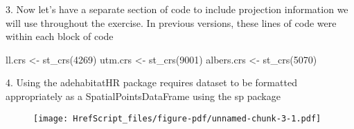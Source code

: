 \documentclass[
  letterpaper,
]{book}
\newenvironment{Shaded}{\begin{snugshade}}{\end{snugshade}}
\newcommand{\AttributeTok}[1]{\textcolor[rgb]{0.40,0.45,0.13}{#1}}
\newcommand{\CommentTok}[1]{\textcolor[rgb]{0.37,0.37,0.37}{#1}}
\newcommand{\DecValTok}[1]{\textcolor[rgb]{0.68,0.00,0.00}{#1}}
\newcommand{\FunctionTok}[1]{\textcolor[rgb]{0.28,0.35,0.67}{#1}}
\newcommand{\NormalTok}[1]{\textcolor[rgb]{0.00,0.23,0.31}{#1}}
\newcommand{\OtherTok}[1]{\textcolor[rgb]{0.00,0.23,0.31}{#1}}
\newcommand{\SpecialCharTok}[1]{\textcolor[rgb]{0.37,0.37,0.37}{#1}}
\newcommand{\StringTok}[1]{\textcolor[rgb]{0.13,0.47,0.30}{#1}}
\begin{document}
3. Now let's have a separate section of code to include projection
information we will use throughout the exercise. In previous versions,
these lines of code were within each block of code

\begin{Shaded}
\begin{Highlighting}[]
\NormalTok{ll.crs }\OtherTok{\textless{}{-}} \FunctionTok{st\_crs}\NormalTok{(}\DecValTok{4269}\NormalTok{)}
\NormalTok{utm.crs }\OtherTok{\textless{}{-}} \FunctionTok{st\_crs}\NormalTok{(}\DecValTok{9001}\NormalTok{)}
\NormalTok{albers.crs }\OtherTok{\textless{}{-}} \FunctionTok{st\_crs}\NormalTok{(}\DecValTok{5070}\NormalTok{)}
\end{Highlighting}
\end{Shaded}

4. Using the adehabitatHR package requires dataset to be formatted
appropriately as a SpatialPointsDataFrame using the sp package

\begin{Shaded}
\end{Shaded}

\begin{figure}[H]

{\centering \texttt{[image: HrefScript\_files/figure-pdf/unnamed-chunk-3-1.pdf]}

}

\end{figure}
\end{document}
